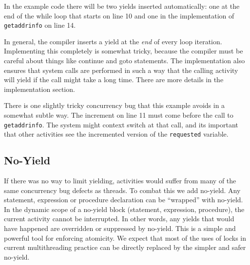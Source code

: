 \documentclass[pldi,10pt,preprint]{sigplanconf-pldi16}
\begin{document}
In the example code there will be two yields inserted automatically: one at the end of the while loop that starts on line 10 and one in the implementation of \texttt{getaddrinfo} on line 14.

In general, the \charcoal{} compiler inserts a yield at the \emph{end} of every loop iteration.
Implementing this completely is somewhat tricky, because the compiler must be careful about things like continue and goto statements.
The implementation also ensures that system calls are performed in such a way that the calling activity will yield if the call might take a long time.
There are more details in the implementation section.

There is one slightly tricky concurrency bug that this example avoids in a somewhat subtle way.
The increment on line 11 must come before the call to \texttt{getaddrinfo}.
The system might context switch at that call, and its important that other activities see the incremented version of the \texttt{requested} variable.








\subsection{No-Yield}

If there was no way to limit yielding, activities would suffer from many of the same concurrency bug defects as threads.
To combat this we add no-yield.
Any statement, expression or procedure declaration can be ``wrapped'' with no-yield.
In the dynamic scope of a no-yield block (statement, expression, procedure), the current activity cannot be interrupted.
In other words, any yields that would have happened are overridden or suppressed by no-yield.
This is a simple and powerful tool for enforcing atomicity.
We expect that most of the uses of locks in current multithreading practice can be directly replaced by the simpler and safer no-yield.
\end{document}
